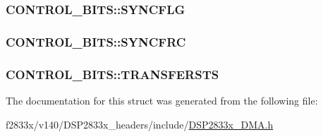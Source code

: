 \subsubsection[{S\+Y\+N\+C\+F\+L\+G}]{ C\+O\+N\+T\+R\+O\+L\+\_\+\+B\+I\+T\+S\+::\+S\+Y\+N\+C\+F\+L\+G}\label{struct_c_o_n_t_r_o_l___b_i_t_s_a92d47aeb57b40a06b0a9e9e41b5de187}
\hypertarget{struct_c_o_n_t_r_o_l___b_i_t_s_a017644d8b8069e8127eb8a42734f2e0e}{}
\subsubsection[{S\+Y\+N\+C\+F\+R\+C}]{ C\+O\+N\+T\+R\+O\+L\+\_\+\+B\+I\+T\+S\+::\+S\+Y\+N\+C\+F\+R\+C}\label{struct_c_o_n_t_r_o_l___b_i_t_s_a017644d8b8069e8127eb8a42734f2e0e}
\hypertarget{struct_c_o_n_t_r_o_l___b_i_t_s_a6ae7d9631f3c049dc7f3b748cb536c8c}{}
\subsubsection[{T\+R\+A\+N\+S\+F\+E\+R\+S\+T\+S}]{ C\+O\+N\+T\+R\+O\+L\+\_\+\+B\+I\+T\+S\+::\+T\+R\+A\+N\+S\+F\+E\+R\+S\+T\+S}\label{struct_c_o_n_t_r_o_l___b_i_t_s_a6ae7d9631f3c049dc7f3b748cb536c8c}


The documentation for this struct was generated from the following file\+:\begin{DoxyCompactItemize}
\item 
f2833x/v140/\+D\+S\+P2833x\+\_\+headers/include/\hyperlink{_d_s_p2833x___d_m_a_8h}{D\+S\+P2833x\+\_\+\+D\+M\+A.\+h}\end{DoxyCompactItemize}
